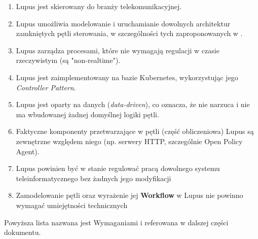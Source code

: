 \begin{enumerate}
    \item \label{req:1} Lupus jest skierowany do branży telekomunikacyjnej.
    \item \label{req:2} Lupus umożliwia modelowanie i uruchamianie dowolnych architektur zamkniętych pętli sterowania, w szczególności tych zaproponowanych w \cite{enioverview}.
    \item \label{req:3} Lupus zarządza procesami, które nie wymagają regulacji w czasie rzeczywistym (są "non-realtime").
    \item \label{req:4} Lupus jest zaimplementowany na bazie Kubernetes, wykorzystując jego \textit{Controller Pattern}.
    \item \label{req:5} Lupus jest oparty na danych (\textit{data-driven}), co oznacza, że nie narzuca i nie ma wbudowanej żadnej domyślnej logiki pętli.
    \item \label{req:6} Faktyczne komponenty przetwarzające w pętli (część obliczeniowa) Lupus są zewnętrzne względem niego (np. serwery HTTP, szczególnie Open Policy Agent).
    \item \label{req:7} Lupus powinien być w stanie regulować pracą dowolnego systemu teleinformatycznego bez żadnych jego modyfikacji
    \item \label{req:8} Zamodelowanie pętli oraz wyrażenie jej \textbf{Workflow} w Lupus nie powinno wymagać umiejętności technicznych
\end{enumerate}

Powyższa lista nazwana jest Wymaganiami i referowana w dalszej części dokumentu. 
